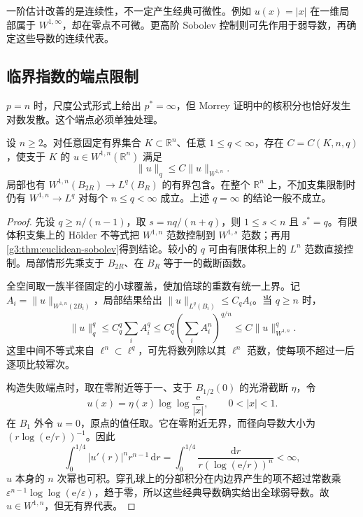 \ProseParagraphBreak

一阶估计改善的是连续性，不一定产生经典可微性。例如 \(u(x)=|x|\) 在一维局部属于 \(W^{1,\infty}\)，却在零点不可微。更高阶 Sobolev 控制则可先作用于弱导数，再确定这些导数的连续代表。

\subsection{临界指数的端点限制}
\label{g3:subsec:1103:04}
\(p=n\) 时，尺度公式形式上给出 \(p^*=\infty\)，但 Morrey 证明中的核积分也恰好发生对数发散。这个端点必须单独处理。

\begin{proposition}\label{g3:prop:critical-sobolev}
	设 \(n\ge2\)。对任意固定有界集合 \(K\subset\mathbb R^n\)、任意 \(1\le q<\infty\)，存在 \(C=C(K,n,q)\)，使支于 \(K\) 的 \(u\in W^{1,n}(\mathbb R^n)\) 满足
	\[
		\|u\|_q\le C\|u\|_{W^{1,n}}.
	\]
	局部也有 \(W^{1,n}(B_{2R})\to L^q(B_R)\) 的有界包含。在整个 \(\mathbb R^n\) 上，不加支集限制时仍有 \(W^{1,n}\to L^q\) 对每个 \(n\le q<\infty\) 成立。上述 \(q=\infty\) 的结论一般不成立。
\end{proposition}
\begin{proof}
	先设 \(q\ge n/(n-1)\)，取 \(s=nq/(n+q)\)，则 \(1\le s<n\) 且 \(s^*=q\)。有限体积支集上的 Hölder 不等式把 \(W^{1,n}\) 范数控制到 \(W^{1,s}\) 范数；再用\cref{g3:thm:euclidean-sobolev}得到结论。较小的 \(q\) 可由有限体积上的 \(L^n\) 范数直接控制。局部情形先乘支于 \(B_{2R}\)、在 \(B_R\) 等于一的截断函数。

	全空间取一族半径固定的小球覆盖，使加倍球的重数有统一上界。记 \(A_i=\|u\|_{W^{1,n}(2B_i)}\)，局部结果给出 \(\|u\|_{L^q(B_i)}\le C_qA_i\)。当 \(q\ge n\) 时，
	\[
		\|u\|_q^q\le C_q^q\sum_iA_i^q
		\le C_q^q\left(\sum_iA_i^n\right)^{q/n}
		\le C\|u\|_{W^{1,n}}^q.
	\]
	这里中间不等式来自 \(\ell^n\subset\ell^q\)，可先将数列除以其 \(\ell^n\) 范数，使每项不超过一后逐项比较幂次。

	构造失败端点时，取在零附近等于一、支于 \(B_{1/2}(0)\) 的光滑截断 \(\eta\)，令
	\[
		u(x)=\eta(x)\log\log\frac{\mathrm e}{|x|},\qquad 0<|x|<1.
	\]
	在 \(B_1\) 外令 \(u=0\)，原点的值任取。它在零附近无界，而径向导数大小为 \((r\log(\mathrm e/r))^{-1}\)。因此
	\[
		\int_0^{1/4}|u'(r)|^n r^{n-1}\,\mathrm dr
		=\int_0^{1/4}\frac{\mathrm dr}{r(\log(\mathrm e/r))^n}<\infty,
	\]
	\(u\) 本身的 \(n\) 次幂也可积。穿孔球上的分部积分在内边界产生的项不超过常数乘 \(\varepsilon^{n-1}\log\log(\mathrm e/\varepsilon)\)，趋于零，所以这些经典导数确实给出全球弱导数。故 \(u\in W^{1,n}\)，但无有界代表。
\end{proof}

